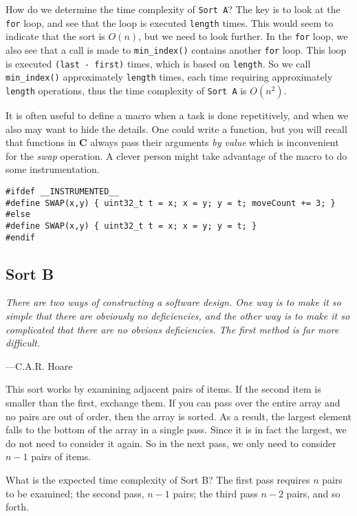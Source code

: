 \documentclass{article}
\begin{document}
How do we determine the time complexity of \texttt{Sort A}? The key
is to look at the \texttt{for} loop, and see that the loop is
executed \texttt{length} times. This would seem to indicate that
the sort is $O(n)$, but we need to look further. In the \texttt{for}
loop, we also see that a call is made to \texttt{min\_index()} contains another \texttt{for} loop. This loop is executed \texttt{(last
- first)} times, which is based on \texttt{length}.  So we call
\texttt{min\_index()} approximately \texttt{length} times, each time
requiring approximately \texttt{length} operations, thus the time
complexity of \texttt{Sort A} is $O(n^2)$.

It is often useful to define a macro when a task is done repetitively,
and when we also may want to hide the details. One could write a
function, but you will recall that functions in \textbf{C} always
pass their arguments \emph{by value} which is inconvenient for the
\emph{swap} operation. A clever person might take advantage of the
macro to do some instrumentation.

\begin{lstlisting}[title=SWAP macro]
#ifdef __INSTRUMENTED__
#define SWAP(x,y) { uint32_t t = x; x = y; y = t; moveCount += 3; }
#else
#define SWAP(x,y) { uint32_t t = x; x = y; y = t; }
#endif
\end{lstlisting}

\subsection{Sort B} %
\epigraph{\emph{There are two ways of constructing a software design. One way is to make it so simple that there are obviously no deficiencies, and the other way is to make it so complicated that there are no obvious deficiencies. The first method is far more difficult.
}}{---C.A.R. Hoare}

\noindent This sort works by examining adjacent pairs of items. If the second item is
smaller than the first, exchange them. If you can pass over the entire array
and no pairs are out of order, then the array is sorted. As a result, the largest element falls to the bottom of the array in a single pass. Since it is in fact the largest, we do not need to consider it again. So in the next pass, we only need to consider $n-1$ pairs of items.

What is the expected time complexity of Sort B? The first pass
requires $n$ pairs to be examined; the second pass, $n-1$ pairs; the third
pass $n-2$ pairs, and so forth.
\end{document}
